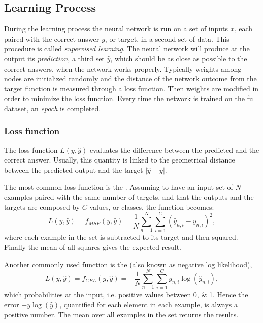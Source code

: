 \subsection{Learning Process}
\label{ssec:Learning_Process}
During the learning process the neural network is run on a set of inputs ${x}$, each paired with the correct answer ${y}$, or target, in a second set of data.
This procedure is called \textit{supervised learning}.
The neural network will produce at the output its \textit{prediction}, a third set ${\hat{y}}$, which should be as close as possible to the correct answers, when the network works properly.
Typically weights among nodes are initialized randomly and the distance of the network outcome from the target function is measured through a loss function.
Then weights are modified in order to minimize the loss function.%
Every time the network is trained on the full dataset, an \textit{epoch} is completed.

\subsubsection{Loss function}
\label{sssec:Loss_function}
The loss function $L(y, \hat{y})$ evaluates the difference between the predicted and the correct answer.
Usually, this quantity is linked to the geometrical distance between the predicted output and the target $\left| \hat{y}-y \right|$.

The most common loss function is the .
Assuming to have an input set of $N$ examples paired with the same number of targets, and that the outputs and the targets are composed by $C$ values, or classes, the function becomes:
\begin{equation}
	L(y, \hat{y}) = f_{MSE}(y, \hat{y}) = \frac{1}{N} \sum_{n=1}^N \sum_{i=1}^C \left( \hat{y}_{n,i} - y_{n,i} \right)^2,
\end{equation}
where each example in the set is subtracted to its target and then squared.
Finally the mean of all squares gives the expected result.

Another commonly used function is the  (also known as negative log likelihood),
\begin{equation}
	L(y, \hat{y}) = f_{CEL}(y, \hat{y}) = - \frac{1}{N} \sum_{n=1}^N \sum_{i=1}^C y_{n,i} \log \left( \hat{y}_{n,i} \right),
\end{equation}
which probabilities at the input, i.e. positive values between \numlist{0;1}.
Hence the error $-y\log \left( \hat{y} \right)$, quantified for each element in each example, is always a positive number.
The mean over all examples in the set returns the results.

